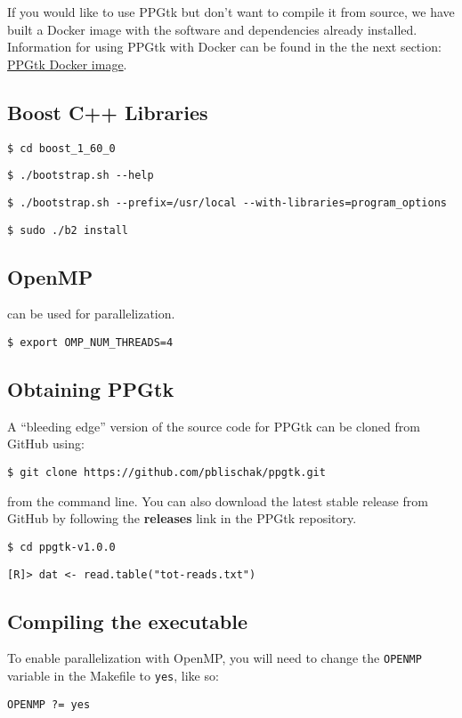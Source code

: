 \documentclass[11pt,english,letterpaper,oneside]{article}
\newcommand{\code}[1]{\hspace{5pt} \texttt{\$ #1}}
\newcommand{\rcode}[1]{\hspace{5pt} \texttt{[R]> #1}}
\newcommand{\makefile}[1]{\hspace{5pt} \texttt{#1}}
\begin{document}
\hspace{15pt} If you would like to use PPGtk but don't want to compile it from source, we have built a Docker image with the software and dependencies already installed. Information for using PPGtk with Docker can be found in the the next section: \hyperref[ppgtk-docker]{PPGtk Docker image}.

\subsection{Boost C++ Libraries}


\code{cd boost\_1\_60\_0}

\code{./bootstrap.sh -{}-help}

\code{./bootstrap.sh -{}-prefix=/usr/local -{}-with-libraries=program\_options}

\code{sudo ./b2 install}

\subsection{OpenMP}

can be used for parallelization.

\code{export OMP\_NUM\_THREADS=4}

\subsection{Obtaining PPGtk}

A ``bleeding edge'' version of the source code for PPGtk can be cloned from GitHub using:

\code{git clone https://github.com/pblischak/ppgtk.git}

from the command line. You can also download the latest stable release from GitHub by following the \textbf{releases} link in the PPGtk repository.

\code{cd ppgtk-v1.0.0}

\rcode{dat <- read.table("tot-reads.txt")}

\subsection{Compiling the executable}

To enable parallelization with OpenMP, you will need to change the \texttt{OPENMP} variable in the Makefile to \texttt{yes}, like so:

\makefile{OPENMP ?= yes}
\end{document}
